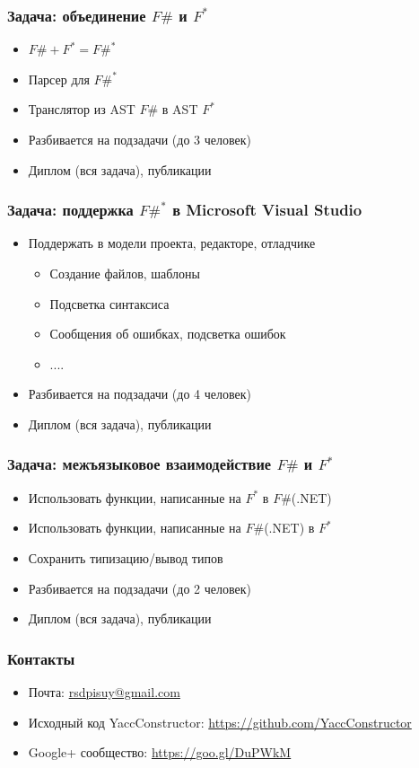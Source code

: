 \documentclass{beamer}
\begin{document}
\begin{frame}
  \transwipe[direction=90]
  \frametitle{Задача: объединение $F\#$ и $F^*$}
  \begin{itemize}
    \item $F\# + F^* = F\#^*$
    \item Парсер для $F\#^*$
    \item Транслятор из AST $F\#$ в AST $F^*$
    \item Разбивается на подзадачи (до 3 человек)
    \item Диплом (вся задача), публикации
  \end{itemize}
\end{frame}

\begin{frame}
  \transwipe[direction=90]
  \frametitle{Задача: поддержка $F\#^*$ в Microsoft Visual Studio}
  \begin{itemize}
    \item Поддержать в модели проекта, редакторе, отладчике
      \begin{itemize}
        \item Создание файлов, шаблоны
        \item Подсветка синтаксиса
        \item Сообщения об ошибках, подсветка ошибок
        \item ....
      \end{itemize}
    \item Разбивается на подзадачи (до 4 человек)
    \item Диплом (вся задача), публикации
  \end{itemize}
\end{frame}

\begin{frame}
  \transwipe[direction=90]
  \frametitle{Задача: межъязыковое взаимодействие $F\#$ и $F^*$}
  \begin{itemize}
    \item Использовать функции, написанные на $F^*$ в $F\#$(.NET)
    \item Использовать функции, написанные на $F\#$(.NET) в $F^*$
    \item Сохранить типизацию/вывод типов
    \item Разбивается на подзадачи (до 2 человек)
    \item Диплом (вся задача), публикации
  \end{itemize}
\end{frame}
            
\begin{frame}
\transwipe[direction=90]
\frametitle{Контакты}
\begin{itemize}
  \item Почта: \url{rsdpisuy@gmail.com}
  \item Исходный код YaccConstructor: \url{https://github.com/YaccConstructor}
  \item Google+ сообщество: \url{https://goo.gl/DuPWkM}
\end{itemize}
\end{frame}
\end{document}
